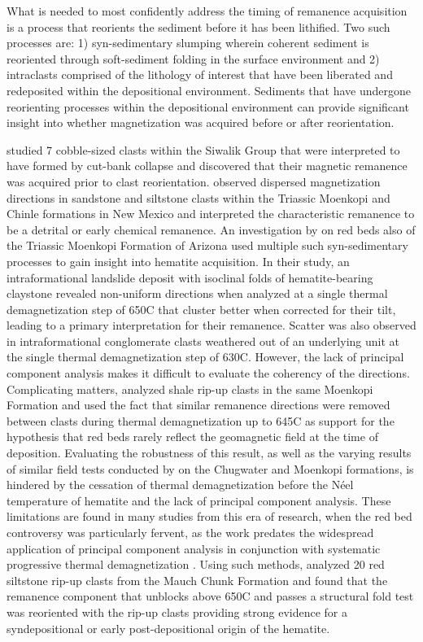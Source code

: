 \documentclass[draft]{agujournal2018}
\begin{document}
What is needed to most confidently address the timing of remanence acquisition is a process that reorients the sediment before it has been lithified. Two such processes are: 1) syn-sedimentary slumping wherein coherent sediment is reoriented through soft-sediment folding in the surface environment and 2) intraclasts comprised of the lithology of interest that have been liberated and redeposited within the depositional environment. Sediments that have undergone reorienting processes within the depositional environment can provide significant insight into whether magnetization was acquired before or after reorientation.

\citet{Tauxe1980a} studied 7 cobble-sized clasts within the Siwalik Group that were interpreted to have formed by cut-bank collapse and discovered that their magnetic remanence was acquired prior to clast reorientation. \citet{Molina-Garza1991a} observed dispersed magnetization directions in sandstone and siltstone clasts within the Triassic Moenkopi and Chinle formations in New Mexico and interpreted the characteristic remanence to be a detrital or early chemical remanence. An investigation by \citet{Purucker1980a} on red beds also of the Triassic Moenkopi Formation of Arizona used multiple such syn-sedimentary processes to gain insight into hematite acquisition. In their study, an intraformational landslide deposit with isoclinal folds of hematite-bearing claystone revealed non-uniform directions when analyzed at a single thermal demagnetization step of 650\textdegree C that cluster better when corrected for their tilt, leading to a primary interpretation for their remanence. Scatter was also observed in intraformational conglomerate clasts weathered out of an underlying unit at the single thermal demagnetization step of 630\textdegree C. However, the lack of principal component analysis makes it difficult to evaluate the coherency of the directions. Complicating matters, \citet{Larson1982b} analyzed shale rip-up clasts in the same Moenkopi Formation and used the fact that similar remanence directions were removed between clasts during thermal demagnetization up to 645\textdegree C as support for the hypothesis that red beds rarely reflect the geomagnetic field at the time of deposition. Evaluating the robustness of this result, as well as the varying results of similar field tests conducted by \citet{Liebes1982a} on the Chugwater and Moenkopi formations, is hindered by the cessation of thermal demagnetization before the N\'eel temperature of hematite and the lack of principal component analysis. These limitations are found in many studies from this era of research, when the red bed controversy was particularly fervent, as the work predates the widespread application of principal component analysis in conjunction with systematic progressive thermal demagnetization \citep{Kirschvink1980a, Van-Der-Voo2012a}. Using such methods, \citet{Opdyke2004a} analyzed 20 red siltstone rip-up clasts from the Mauch Chunk Formation and found that the remanence component that unblocks above 650\textdegree C and passes a structural fold test was reoriented with the rip-up clasts providing strong evidence for a syndepositional or early post-depositional origin of the hematite.
\end{document}
